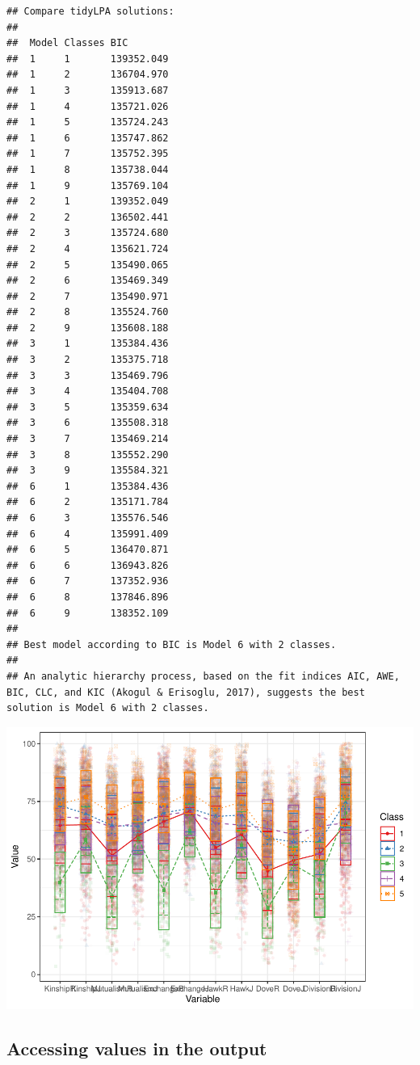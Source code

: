 \documentclass[man]{apa6}
\begin{document}
\begin{verbatim}
## Compare tidyLPA solutions:
## 
##  Model Classes BIC       
##  1     1       139352.049
##  1     2       136704.970
##  1     3       135913.687
##  1     4       135721.026
##  1     5       135724.243
##  1     6       135747.862
##  1     7       135752.395
##  1     8       135738.044
##  1     9       135769.104
##  2     1       139352.049
##  2     2       136502.441
##  2     3       135724.680
##  2     4       135621.724
##  2     5       135490.065
##  2     6       135469.349
##  2     7       135490.971
##  2     8       135524.760
##  2     9       135608.188
##  3     1       135384.436
##  3     2       135375.718
##  3     3       135469.796
##  3     4       135404.708
##  3     5       135359.634
##  3     6       135508.318
##  3     7       135469.214
##  3     8       135552.290
##  3     9       135584.321
##  6     1       135384.436
##  6     2       135171.784
##  6     3       135576.546
##  6     4       135991.409
##  6     5       136470.871
##  6     6       136943.826
##  6     7       137352.936
##  6     8       137846.896
##  6     9       138352.109
## 
## Best model according to BIC is Model 6 with 2 classes.
## 
## An analytic hierarchy process, based on the fit indices AIC, AWE, BIC, CLC, and KIC (Akogul & Erisoglu, 2017), suggests the best solution is Model 6 with 2 classes.
\end{verbatim}

\includegraphics{paper_files/figure-latex/plot-one-solution-1.pdf}

\hypertarget{accessing-values-in-the-output}{%
\subsection{Accessing values in the output}\label{accessing-values-in-the-output}}
\end{document}
